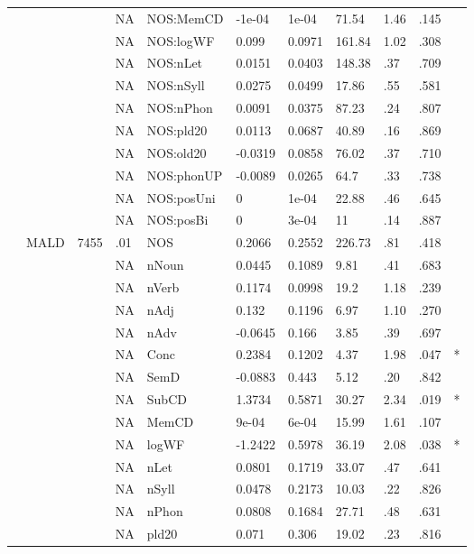 \begin{table}[ht]
\begin{tabular}{lllllllllll}
   &  &  & NA & NOS:MemCD & -1e-04 & 1e-04 & 71.54 & 1.46 & .145 &   \\ 
   &  &  & NA & NOS:logWF & 0.099 & 0.0971 & 161.84 & 1.02 & .308 &   \\ 
   &  &  & NA & NOS:nLet & 0.0151 & 0.0403 & 148.38 & .37 & .709 &   \\ 
   &  &  & NA & NOS:nSyll & 0.0275 & 0.0499 & 17.86 & .55 & .581 &   \\ 
   &  &  & NA & NOS:nPhon & 0.0091 & 0.0375 & 87.23 & .24 & .807 &   \\ 
   &  &  & NA & NOS:pld20 & 0.0113 & 0.0687 & 40.89 & .16 & .869 &   \\ 
   &  &  & NA & NOS:old20 & -0.0319 & 0.0858 & 76.02 & .37 & .710 &   \\ 
   &  &  & NA & NOS:phonUP & -0.0089 & 0.0265 & 64.7 & .33 & .738 &   \\ 
   &  &  & NA & NOS:posUni & 0 & 1e-04 & 22.88 & .46 & .645 &   \\ 
   &  &  & NA & NOS:posBi & 0 & 3e-04 & 11 & .14 & .887 &   \\ 
   & MALD & 7455 & .01 & NOS & 0.2066 & 0.2552 & 226.73 & .81 & .418 &   \\ 
   &  &  & NA & nNoun & 0.0445 & 0.1089 & 9.81 & .41 & .683 &   \\ 
   &  &  & NA & nVerb & 0.1174 & 0.0998 & 19.2 & 1.18 & .239 &   \\ 
   &  &  & NA & nAdj & 0.132 & 0.1196 & 6.97 & 1.10 & .270 &   \\ 
   &  &  & NA & nAdv & -0.0645 & 0.166 & 3.85 & .39 & .697 &   \\ 
   &  &  & NA & Conc & 0.2384 & 0.1202 & 4.37 & 1.98 & .047 & * \\ 
   &  &  & NA & SemD & -0.0883 & 0.443 & 5.12 & .20 & .842 &   \\ 
   &  &  & NA & SubCD & 1.3734 & 0.5871 & 30.27 & 2.34 & .019 & * \\ 
   &  &  & NA & MemCD & 9e-04 & 6e-04 & 15.99 & 1.61 & .107 &   \\ 
   &  &  & NA & logWF & -1.2422 & 0.5978 & 36.19 & 2.08 & .038 & * \\ 
   &  &  & NA & nLet & 0.0801 & 0.1719 & 33.07 & .47 & .641 &   \\ 
   &  &  & NA & nSyll & 0.0478 & 0.2173 & 10.03 & .22 & .826 &   \\ 
   &  &  & NA & nPhon & 0.0808 & 0.1684 & 27.71 & .48 & .631 &   \\ 
   &  &  & NA & pld20 & 0.071 & 0.306 & 19.02 & .23 & .816 &   \\ 

\end{tabular}
\end{table}
